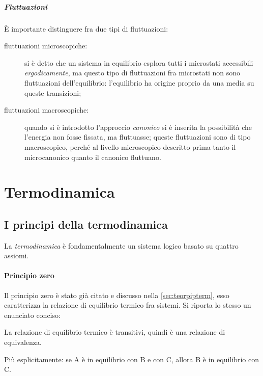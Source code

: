 \subparagraph{Fluttuazioni} \`E importante distinguere fra due tipi di fluttuazioni:
\begin{description}
	\item[fluttuazioni microscopiche:] si è detto che un sistema in equilibrio esplora tutti i microstati accessibili \textit{ergodicamente}, ma questo tipo di fluttuazioni fra microstati non sono fluttuazioni dell'equilibrio: l'equilibrio ha origine proprio da una media su queste transizioni;
	\item[fluttuazioni macroscopiche:] quando si è introdotto l'approccio \textit{canonico} si è inserita la possibilità che l'energia non fosse fissata, ma fluttuasse; queste fluttuazioni sono di tipo macroscopico, perché al livello microscopico descritto prima tanto il microcanonico quanto il canonico fluttuano.
\end{description}


\section{Termodinamica}
\label{sec:termod}


\subsection{I principi della termodinamica}
La \textit{termodinamica} è fondamentalmente un sistema logico basato su quattro assiomi.

\paragraph{Principio zero} Il principio zero è stato già citato e discusso nella \cref{sec:teorpipterm}, esso caratterizza la relazione di equilibrio termico fra sistemi. Si riporta lo stesso un enunciato conciso:

\begin{defn}
	La relazione di equilibrio termico è transitivi, quindi è una relazione di equivalenza.
	
	Più esplicitamente: se A è in equilibrio con B e con C, allora B è in equilibrio con C.
\end{defn}

